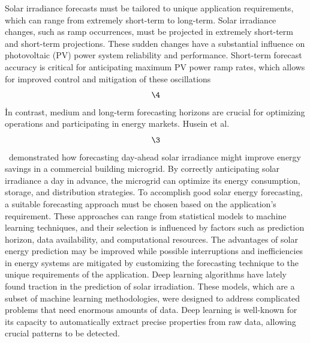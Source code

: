 \documentclass[a4paper,fleqn]{cas-sc}
\begin{document}
Solar irradiance forecasts must be tailored to unique application requirements, which can range from extremely short-term to long-term. Solar irradiance changes, such as ramp occurrences, must be projected in extremely short-term and short-term projections. These sudden changes have a substantial influence on photovoltaic (PV) power system reliability and performance. Short-term forecast accuracy is critical for anticipating maximum PV power ramp rates, which allows for improved control and mitigation of these oscillations \[\4\]\. In contrast, medium and long-term forecasting horizons are crucial for optimizing operations and participating in energy markets. Husein et al. \[\3\]\ demonstrated how forecasting day-ahead solar irradiance might improve energy savings in a commercial building microgrid. By correctly anticipating solar irradiance a day in advance, the microgrid can optimize its energy consumption, storage, and distribution strategies. To accomplish good solar energy forecasting, a suitable forecasting approach must be chosen based on the application's requirement. These approaches can range from statistical models to machine learning techniques, and their selection is influenced by factors such as prediction horizon, data availability, and computational resources. The advantages of solar energy prediction may be improved while possible interruptions and inefficiencies in energy systems are mitigated by customizing the forecasting technique to the unique requirements of the application.
Deep learning algorithms have lately found traction in the prediction of solar irradiation. These models, which are a subset of machine learning methodologies, were designed to address complicated problems that need enormous amounts of data. Deep learning is well-known for its capacity to automatically extract precise properties from raw data, allowing crucial patterns to be detected.
\end{document}
